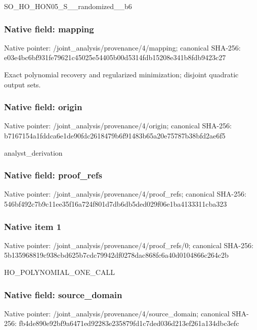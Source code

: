 \documentclass[10pt,a4paper]{article}
\begin{document}
\begingroup\raggedright\sloppy SO\_\allowbreak{}HO\_\allowbreak{}HON05\_\allowbreak{}S\_\allowbreak{}\_\allowbreak{}randomized\_\allowbreak{}\_\allowbreak{}b6\par\endgroup

\subsubsection{Native field: mapping}
Native pointer: /joint\_\allowbreak{}analysis/provenance/4/mapping; canonical SHA-256: e03e4bc6bf931fe79621c45025e54405b00d5314fdb15208e341b8fdb9423c27

\begingroup\raggedright\sloppy Exact polynomial recovery and regularized minimization;\allowbreak{} disjoint quadratic output sets.\par\endgroup

\subsubsection{Native field: origin}
Native pointer: /joint\_\allowbreak{}analysis/provenance/4/origin; canonical SHA-256: b7167154a1fddca6e1de90fdc2618479b6f91483b65a20e75787b38bfd2ae6f5

\begingroup\raggedright\sloppy analyst\_\allowbreak{}derivation\par\endgroup

\subsubsection{Native field: proof\_\allowbreak{}refs}
Native pointer: /joint\_\allowbreak{}analysis/provenance/4/proof\_\allowbreak{}refs; canonical SHA-256: 546bf492c7b9c11ee35f16a724f801d7db6db5ded029f06e1ba4133311cba323

\subsubsection{Native item 1}
Native pointer: /joint\_\allowbreak{}analysis/provenance/4/proof\_\allowbreak{}refs/0; canonical SHA-256: 5b135968819c938cbd625b7cdc79942df0278dac868fc6a40d0104866c264c2b

\begingroup\raggedright\sloppy HO\_\allowbreak{}POLYNOMIAL\_\allowbreak{}ONE\_\allowbreak{}CALL\par\endgroup

\subsubsection{Native field: source\_\allowbreak{}domain}
Native pointer: /joint\_\allowbreak{}analysis/provenance/4/source\_\allowbreak{}domain; canonical SHA-256: fb4de890e92bf9a6471ed92283e235879fd1c7ded036d213ef261a134dbc3efc
\end{document}
